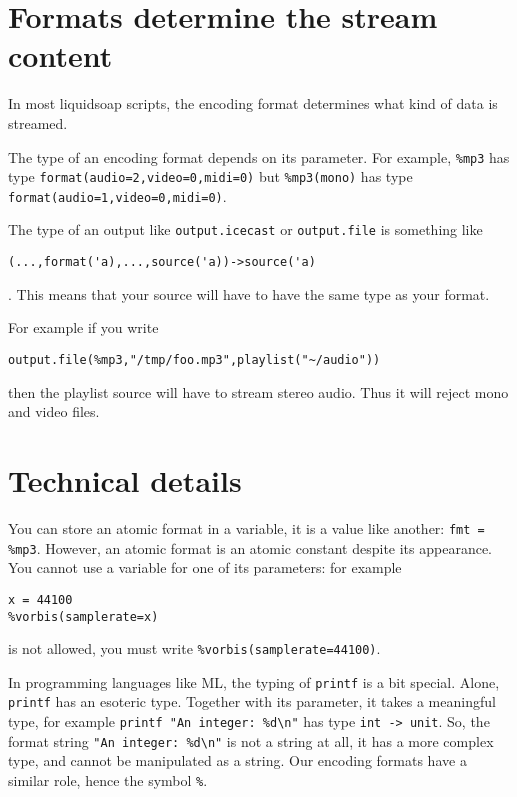 \section{Formats determine the stream content}
In most liquidsoap scripts, the encoding format determines what
kind of data is streamed.

The type of an encoding format depends on its parameter.
For example, \verb+%mp3+ has type \verb+format(audio=2,video=0,midi=0)+
but \verb+%mp3(mono)+ has type \verb+format(audio=1,video=0,midi=0)+.

The type of an output like \verb+output.icecast+
or \verb+output.file+ is something like
\begin{verbatim}
(...,format('a),...,source('a))->source('a)
\end{verbatim}
.
This means that your source will have to have the same type as your format.

For example if you write
\begin{verbatim}
output.file(%mp3,"/tmp/foo.mp3",playlist("~/audio"))
\end{verbatim}

then the playlist source will have to stream stereo audio.
Thus it will reject mono and video files.

\section{Technical details}
You can store an atomic format in a variable, it is a value like another:
\verb+fmt = %mp3+. However, an atomic format is an atomic constant despite its
appearance. You cannot use a variable for one of its parameters: for
example 

\begin{verbatim}
x = 44100
%vorbis(samplerate=x)
\end{verbatim}
is not allowed,
you must write \verb+%vorbis(samplerate=44100)+.

In programming languages like ML, the typing of \verb+printf+ is a bit special.
Alone, \verb+printf+ has an esoteric type. Together with its parameter, it
takes a meaningful type, for example \verb+printf "An integer: %d\n"+ has type
\verb+int -> unit+. So, the format string \verb+"An integer: %d\n"+ is not a string
at all, it has a more complex type, and cannot be manipulated as a string.
Our encoding formats have a similar role, hence the symbol \verb+%+.

